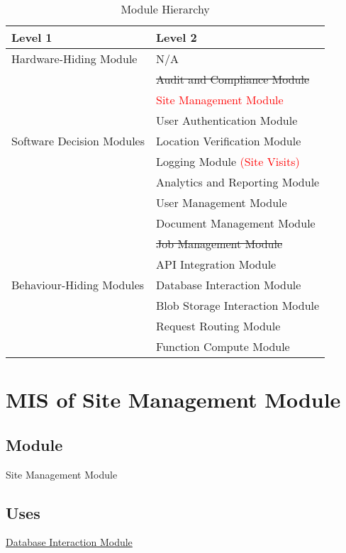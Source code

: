 \documentclass[12pt, titlepage]{article}
\begin{document}
\begin{table}[h!]
  \centering
  \begin{tabular}{p{} p{}}
    \toprule
    \textbf{Level 1}                                       &
    \textbf{Level 2}
    \\
    \midrule

    {Hardware-Hiding Module}                               & N/A
    \\
    \midrule

    \multirow{7}{0.3\textwidth}{Software Decision Modules} &
    \sout{Audit and Compliance Module}\\ &
    \textcolor{red}{Site Management Module}
    \\
    & User Authentication Module      \\
    & Location Verification Module    \\
    & Logging Module \textcolor{red}{(Site Visits)}                  \\
    & Analytics and Reporting Module  \\
    & User Management Module          \\
    & Document Management Module      \\
    &\sout{Job Management Module}           \\
    \midrule

    \multirow{3}{0.3\textwidth}{Behaviour-Hiding Modules}  & {API
    Integration Module}
    \\
    & Database Interaction Module     \\
    & Blob Storage Interaction Module \\
    & Request Routing Module          \\
    & Function Compute Module         \\
    \bottomrule
  \end{tabular}
  \caption{Module Hierarchy}
  \label{TblMH}
\end{table}
\section{MIS of Site Management Module}
\label{sec:SM}

\subsection{Module}
Site Management Module

\subsection{Uses}
\hyperref[sec:DI]{Database Interaction Module}
\end{document}
